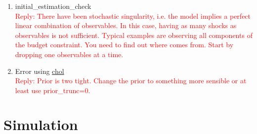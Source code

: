 \documentclass[10pt,math=newtx,citestyle=gb7714-2015,bibstyle=gb7714-2015]{elegantbook}
\begin{document}
{{{\begin{enumerate}
		\textcolor{red}{Reply:
			\begin{itemize}
				\item The issue in the end always is to find the global mode. What you describe is a iterative procedure to find it and it sounds reasonable. However, you should keep track of whether there is actual improvement in the posterior density across runs( and particularly the MCMC). If you are unsure where the mode is and you have rather diffuse priors that do not smooth out the likelihood by much, mode\_compute=4 is not advisable, because it tends to get stuck at local modes.
				\item Sequentially running different mode\_compute makes a lot of sense. In case you did not find the true mode, you increase the likelihood of finding it. In case you already found it, running mode\_compute a second time will just cost your time, but will not do any other harm as the optimizer will stay at the same mode you found before. Using the calibrated value as starting values is recommented in case your mode\_compute fails because of invalid starting values.
			\end{itemize}
		}
		\item initial\_estimation\_check\\
		\textcolor{red}{Reply: There have been stochastic singularity, i.e. the model implies a perfect linear combination of observables. In this case, having as many shocks as observables is not sufficient. Typical examples are observing all components of the budget constraint. You need to find out where comes from. Start by dropping one observables at a time.}
		\item Error using \underline{chol}\\
		\textcolor{red}{Reply: Prior is two tight. Change the prior to something more sensible or at least use prior\_trunc=0.}
		
		
		
		
	\end{enumerate}
	
	\section{Simulation}
	
}}}
\end{document}

